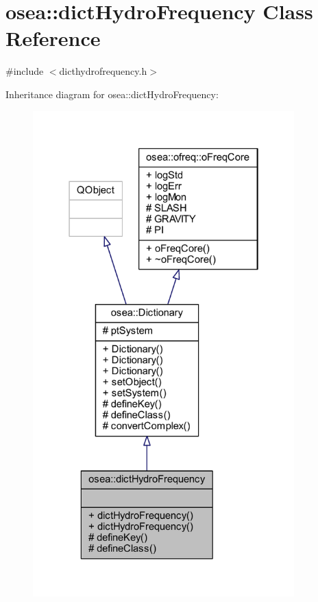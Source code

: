 \hypertarget{classosea_1_1dict_hydro_frequency}{\section{osea\-:\-:dict\-Hydro\-Frequency Class Reference}
\label{classosea_1_1dict_hydro_frequency}
}


{\ttfamily \#include $<$dicthydrofrequency.\-h$>$}



Inheritance diagram for osea\-:\-:dict\-Hydro\-Frequency\-:
\nopagebreak
\begin{figure}[H]
\begin{center}
\leavevmode
\includegraphics[width=286pt]{classosea_1_1dict_hydro_frequency__inherit__graph}
\end{center}
\end{figure}
